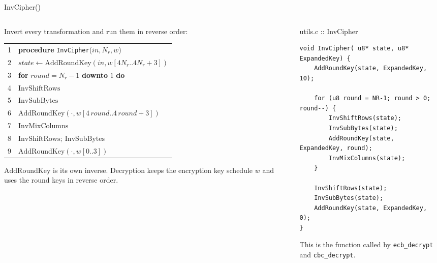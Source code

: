 \documentclass[aspectratio=169,10pt]{beamer}
\makeatletter
\newcommand{\fn}[1]{\mathrm{#1}}
\newcommand{\Nr}{N_{r}}
\newcommand{\kw}[1]{\textbf{#1}}
\newcommand{\ind}{\hspace*{1.1em}}
\newenvironment{pseudo}{\par\footnotesize\renewcommand{\arraystretch}{1.12}%
  \begin{tabular}{@{}r@{\hspace{5pt}}l@{}}}{\end{tabular}\par}
\makeatother
\begin{document}
\begin{frame}[fragile]{InvCipher()}
\begin{columns}[T]
\begin{column}{0.52\textwidth}
\small
Invert every transformation and run them in \alert{reverse order}:\par\vskip3pt
\begin{pseudo}
1 & \kw{procedure} \texttt{InvCipher}($\mathit{in},\Nr,w$) \\
2 & \ind $\mathit{state}\leftarrow\fn{AddRoundKey}(\mathit{in},w[4\Nr..4\Nr{+}3])$ \\
3 & \ind \kw{for} $\mathit{round}=\Nr-1$ \kw{downto} $1$ \kw{do} \\
4 & \ind\ind $\fn{InvShiftRows}$ \\
5 & \ind\ind $\fn{InvSubBytes}$ \\
6 & \ind\ind $\fn{AddRoundKey}(\cdot,w[4\,\mathit{round}..4\,\mathit{round}{+}3])$ \\
7 & \ind\ind $\fn{InvMixColumns}$ \\
8 & \ind $\fn{InvShiftRows};\ \fn{InvSubBytes}$ \\
9 & \ind $\fn{AddRoundKey}(\cdot,w[0..3])$ \\
\end{pseudo}
\vskip3pt
\footnotesize
$\fn{AddRoundKey}$ is its own inverse. Decryption keeps the encryption
key schedule $w$ and uses the round keys in reverse order.
\end{column}
\begin{column}{0.45\textwidth}
\begin{tbox}{utils.c :: InvCipher}
\begin{lstlisting}
void InvCipher( u8* state, u8* ExpandedKey) {
    AddRoundKey(state, ExpandedKey, 10);

    for (u8 round = NR-1; round > 0; round--) {
        InvShiftRows(state);
        InvSubBytes(state);
        AddRoundKey(state, ExpandedKey, round);
        InvMixColumns(state);
    }

    InvShiftRows(state);
    InvSubBytes(state);
    AddRoundKey(state, ExpandedKey, 0);
}
\end{lstlisting}
\end{tbox}
\vskip3pt
{\footnotesize This is the function called by \texttt{ecb\_decrypt} and \texttt{cbc\_decrypt}.}
\end{column}
\end{columns}
\end{frame}
\end{document}
